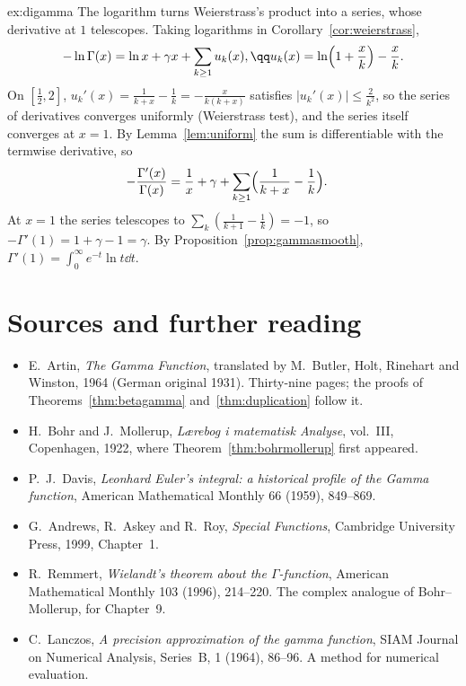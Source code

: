 \begin{solution}{ex:digamma}
\idea The logarithm turns Weierstrass's product into a series, whose derivative at $1$ telescopes.
\writeup Taking logarithms in Corollary~\ref{cor:weierstrass},
\[
\begin{gathered}-\ln\Gamma(x)=\ln x+\gamma x+\sum_{k\ge1}u_k(x),\qq u_k(x)=\ln\Bigl(1+\frac xk\Bigr)-\frac xk.\end{gathered}
\]
On $[\frac12,2]$, $u_k'(x)=\frac1{k+x}-\frac1k=-\frac x{k(k+x)}$ satisfies $|u_k'(x)|\le\frac2{k^2}$, so the series of derivatives converges uniformly
(Weierstrass test), and the series itself converges at $x=1$. By Lemma~\ref{lem:uniform} the sum is differentiable with the
termwise derivative, so
\[
\begin{aligned}-\frac{\Gamma'(x)}{\Gamma(x)}&=\frac1x+\gamma+\sum_{k\ge1}\Bigl(\frac1{k+x}-\frac1k\Bigr).\end{aligned}
\]
At $x=1$ the series telescopes to $\sum_k(\frac1{k+1}-\frac1k)=-1$, so $-\Gamma'(1)=1+\gamma-1=\gamma$. By
Proposition~\ref{prop:gammasmooth}, $\Gamma'(1)=\int_0^\infty e^{-t}\ln t\dd t$.
\end{solution}

\section*{Sources and further reading}

\begin{itemize}
\item E.~Artin, \emph{The Gamma Function}, translated by M.~Butler, Holt, Rinehart and Winston, 1964 (German original 1931).
Thirty-nine pages; the proofs of Theorems~\ref{thm:betagamma} and~\ref{thm:duplication} follow it.
\item H.~Bohr and J.~Mollerup, \emph{L\ae{}rebog i matematisk Analyse}, vol.~III, Copenhagen, 1922, where
Theorem~\ref{thm:bohrmollerup} first appeared.
\item P.~J.~Davis, \emph{Leonhard Euler's integral: a historical profile of the Gamma function}, American Mathematical Monthly
66 (1959), 849--869.
\item G.~Andrews, R.~Askey and R.~Roy, \emph{Special Functions}, Cambridge University Press, 1999, Chapter~1.
\item R.~Remmert, \emph{Wielandt's theorem about the $\Gamma$-function}, American Mathematical Monthly 103 (1996), 214--220. The
complex analogue of Bohr--Mollerup, for Chapter~9.
\item C.~Lanczos, \emph{A precision approximation of the gamma function}, SIAM Journal on Numerical Analysis, Series~B, 1
(1964), 86--96. A method for numerical evaluation.
\end{itemize}
